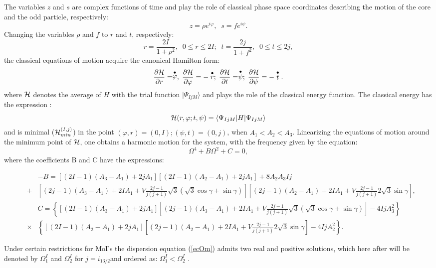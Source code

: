 \documentclass[twocolumn,article,amsmath,amssymb,floatfix,aps]{revtex4}
\begin{document}
The variables $z$ and $s$ are complex functions of time and play the role of classical phase space coordinates describing the motion of the core and the odd particle, respectively:
\begin{equation}
z=\rho e^{i\varphi},\;\;s=fe^{i\psi}. 
\end{equation}
Changing the variables $\rho$ and $f$ to  $ r$ and $t$, respectively:
\begin{equation}
r=\frac{2I}{1+\rho^2},\;\;0\le r\le 2I;\;\;
t=\frac{2j}{1+f^2},\;\; 0\le t\le 2j,
\end{equation}
the classical equations of motion acquire the canonical Hamilton form:
\begin{equation}
\frac{\partial {\cal H}}{\partial r}=\stackrel{\bullet}{\varphi},\;\frac{\partial {\cal H}}{\partial \varphi}=-\stackrel{\bullet}{r};\;
\frac{\partial {\cal H}}{\partial t}=\stackrel{\bullet}{\psi};\;\frac{\partial {\cal H}}{\partial \psi}=-\stackrel{\bullet}{t}.  
\label{eqmot}
\end{equation}
where ${\cal H}$ denotes the average of $H$ with the trial function $|\Psi_{IjM}\rangle$ and plays the role of the classical energy function. 
The classical energy has the expression : 
\begin{equation}
{\cal H}(r,\varphi;t,\psi)=\langle \Psi_{IjM}|H|\Psi_{IjM}\rangle\nonumber\\
\label{classen}
\end{equation} 
and is minimal (${\cal H}^{(I,j)}_{min}$) in the point
$(\varphi,r)=(0,I);(\psi,t)=(0,j)$, when $A_1<A_2<A_3$.   
Linearizing the equations of motion around the minimum point of ${\cal H}$, one obtains a harmonic motion for the system, with the frequency given by the equation:
\begin{equation}
\Omega^4+B\Omega^2+C=0,
\label{ecOm}
\end{equation}
where the coefficients B and C have the expressions:
\begin{widetext}
\begin{eqnarray}
&&-B=\left[(2I-1)(A_3-A_1)+2jA_1\right]\left[(2I-1)(A_2-A_1)+2jA_1\right]+8A_2A_3Ij\\
 &+&\left[(2j-1)(A_3-A_1)+2IA_1+V\frac{2j-1}{j(j+1)}\sqrt{3}(\sqrt{3}\cos\gamma+\sin\gamma)\right]
 \left[(2j-1)(A_2-A_1)+2IA_1+V\frac{2j-1}{j(j+1)}2\sqrt{3}\sin\gamma\right],\nonumber\\
&&C=\left\{\left[(2I-1)(A_3-A_1)+2jA_1\right]\left[(2j-1)(A_3-A_1)+2IA_1+V\frac{2j-1}{j(j+1)}\sqrt{3}(\sqrt{3}\cos\gamma+\sin\gamma)\right]
- 4IjA_3^2\right \}\nonumber\\
 &\times&\left\{\left[(2I-1)(A_2-A_1)+2jA_1\right]\left[(2j-1)(A_2-A_1)+2IA_1+V\frac{2j-1}{j(j+1)}2\sqrt{3}\sin\gamma\right]-4IjA_2^2\right\}. 
\label{BandC}
\end{eqnarray}
\end{widetext}
Under certain restrictions for MoI's the dispersion equation (\ref{ecOm}) admits two real and positive solutions, which here after  will be denoted by $\Omega^{I}_1$ and $\Omega^{I}_{2}$ for $j=i_{13/2}$and ordered as: $\Omega^I_1<\Omega^I_{2}$ . 
\end{document}
